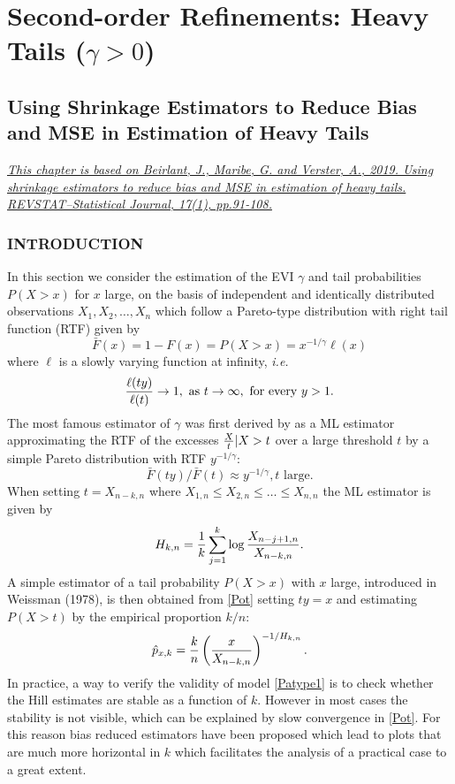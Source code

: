 \part{Second-order Refinements: Heavy Tails ($\gamma>0$)}\label{part1}
\chapter{Using Shrinkage Estimators to Reduce Bias and MSE in Estimation of Heavy Tails}\label{chap3}
\setcounter{equation}{0}

\href{https://www.ine.pt/revstat/pdf/Usingshrinkageestimatorstoreducebias.pdf}{\textit{This chapter is based on Beirlant, J., Maribe, G. and Verster, A., 2019. Using shrinkage estimators to reduce bias and MSE in estimation of heavy tails. REVSTAT–Statistical Journal, 17(1), pp.91-108.}}

\section{INTRODUCTION} %
\label{paper1:sec1}       %
In this section we consider the estimation of the EVI $\gamma$ and tail probabilities $P(X>x)$ for $x$ large, on the basis of independent and identically distributed observations $X_1, X_2, \ldots, X_n$ which follow a Pareto-type distribution with right tail function (RTF) given by
\begin{equation}
\bar{F}(x) = 1-F(x) = P(X>x) = x^{-1/\gamma} \ell (x)
\label{Patype1}
\end{equation}
where $\ell$ is a slowly varying function at infinity, {\it i.e.}
$$
{\ell (ty) \over \ell (t)} \to 1, \mbox{ as } t \to \infty, \mbox{ for every } y>1.
$$
The most famous estimator of $\gamma$ was first derived by \cite{hill1975simple} as a ML estimator approximating the RTF of the excesses ${X \over t} |X>t$ over a large threshold $t$ by a simple Pareto distribution with RTF $y^{-1/\gamma}$: 
\begin{equation}
\bar{F}(ty)/\bar{F}(t) \approx y^{-1/\gamma}, t \mbox{ large}.
\label{Pot}
\end{equation}
When setting $t= X_{n-k,n}$ where $X_{1,n}\leq X_{2,n} \leq \ldots \leq X_{n,n}$ the ML estimator is given by
\begin{equation}
H_{k,n} = {1 \over k}\sum_{j=1}^k \log {X_{n-j+1,n} \over X_{n-k,n}}.
\label{Hill}
\end{equation}
A simple estimator of a tail probability $P(X>x)$ with $x$ large, introduced in Weissman (1978), is then obtained from \eqref{Pot} setting $ty = x$ and estimating $P(X>t)$ by the empirical proportion $k/n$: 
\begin{equation}
\hat{p}_{x,k} = {k \over n}\left( {x \over X_{n-k,n}}\right)^{-1/H_{k,n}}.
\label{Weiss}
\end{equation}
In practice, a way to verify the validity of model \eqref{Patype1} is to check whether the Hill estimates are stable as a function of $k$. However in most cases the stability is not visible, which can be explained by slow convergence in \eqref{Pot}. For this reason bias reduced estimators have been proposed which lead to plots that are much more horizontal in $k$ which facilitates the analysis of a practical case to a great extent.

